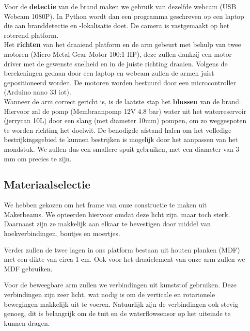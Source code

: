 \documentclass[kulak]{kulakarticle} %
\begin{document}
		Voor de \textbf{detectie} van de brand maken we gebruik van dezelfde webcam (USB Webcam 1080P). In Python wordt dan een programma geschreven op een laptop die aan branddetectie en -lokalisatie doet. De camera is vastgemaakt op het roterend platform. \\
		
		Het \textbf{richten} van het draaiend platform en de arm gebeurt met behulp van twee motoren (Micro Metal Gear Motor 100:1 HP), deze zullen dankzij een motor driver met de gewenste snelheid en in de juiste richting draaien. Volgens de berekeningen gedaan door een laptop en webcam zullen de armen juist gepositioneerd worden. De motoren worden bestuurd door een microcontroller (Arduino nano 33 iot). \\
		
		Wanneer de arm correct gericht is, is de laatste stap het \textbf{blussen} van de brand. Hiervoor zal de pomp (Membraanpomp 12V 4.8 bar) water uit het waterreservoir (jerrycan 10L) door een slang (met diameter 10mm) pompen, om zo weggespoten te worden richting het doelwit. De benodigde afstand halen om het volledige bestrijkingsgebied te kunnen bestrijken is mogelijk door het aanpassen van het mondstuk. We zullen dus een smallere spuit gebruiken, met een diameter van 3 mm om precies te zijn.\\
		
	\subsection{Materiaalselectie}
	
		We hebben gekozen om het frame van onze constructie te maken uit Makerbeams. We opteerden hiervoor omdat deze licht zijn, maar toch sterk. Daarnaast zijn ze makkelijk aan elkaar te bevestigen door middel van hoekverbindingen, boutjes en moertjes.
		
		Verder zullen de twee lagen in ons platform bestaan uit houten planken (MDF) met een dikte van circa 1 cm. Ook voor het draaielement van onze arm zullen we MDF gebruiken.
		
		Voor de beweegbare arm zullen we verbindingen uit kunststof gebruiken. Deze verbindingen zijn zeer licht, wat nodig is om de verticale en rotarionele bewegingen makkelijk uit te voeren. Natuurlijk zijn de verbindingen ook stevig genoeg, dit is belangrijk om de tuit en de waterflowsensor op het uiteinde te kunnen dragen.
\end{document}
